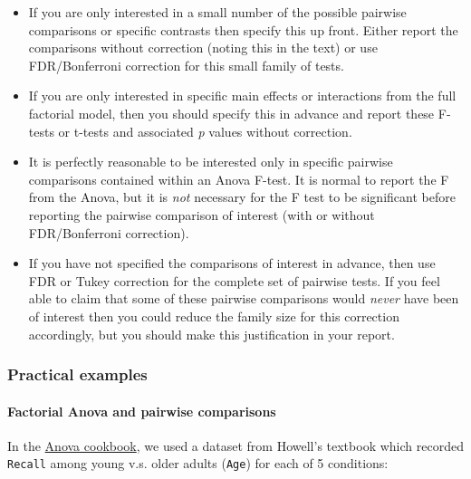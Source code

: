 \documentclass[]{article}
\let\oldparagraph\paragraph
\renewcommand{\paragraph}[1]{\oldparagraph{#1}\mbox{}}
\begin{document}
\begin{itemize}
\item
  If you are only interested in a small number of the possible pairwise
  comparisons or specific contrasts then specify this up front. Either report
  the comparisons without correction (noting this in the text) or use
  FDR/Bonferroni correction for this small family of tests.
\item
  If you are only interested in specific main effects or interactions from the
  full factorial model, then you should specify this in advance and report
  these F-tests or t-tests and associated \emph{p} values without correction.
\item
  It is perfectly reasonable to be interested only in specific pairwise
  comparisons contained within an Anova F-test. It is normal to report the F
  from the Anova, but it is \emph{not} necessary for the F test to be significant
  before reporting the pairwise comparison of interest (with or without
  FDR/Bonferroni correction).
\item
  If you have not specified the comparisons of interest in advance, then use
  FDR or Tukey correction for the complete set of pairwise tests. If you feel
  able to claim that some of these pairwise comparisons would \emph{never} have
  been of interest then you could reduce the family size for this correction
  accordingly, but you should make this justification in your report.
\end{itemize}

\hypertarget{contrasts-examples}{%
\subsubsection*{Practical examples}\label{contrasts-examples}}

\hypertarget{factorial-anova-and-pairwise-comparisons}{%
\paragraph{Factorial Anova and pairwise comparisons}\label{factorial-anova-and-pairwise-comparisons}}

In the \protect\hyperlink{howell-factorial-example}{Anova cookbook}, we used a dataset from
Howell's textbook which recorded \texttt{Recall} among young v.s. older adults (\texttt{Age})
for each of 5 conditions:
\end{document}
